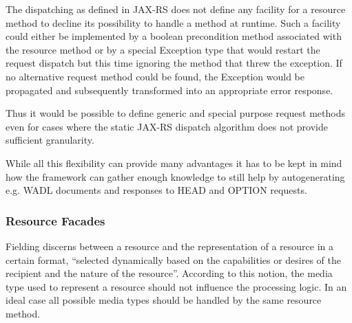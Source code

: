 \documentclass[12pt,a4paper]{scrartcl}		%
\begin{document}
The dispatching as defined in JAX-RS does not define any facility for a resource
method to decline its possibility to handle a method at runtime. Such a facility
could either be implemented by a boolean precondition method associated with the
resource method or by a special Exception type that would restart the request
dispatch but this time ignoring the method that threw the exception. If no
alternative request method could be found, the Exception would be propagated and
subsequently transformed into an appropriate error response.

Thus it would be possible to define generic and special purpose request methods
even for cases where the static JAX-RS dispatch algorithm does not provide
sufficient granularity.

While all this flexibility can provide many advantages it has to be kept in mind
how the framework can gather enough knowledge to still help by autogenerating
e.g. WADL documents and responses to HEAD and OPTION requests.

\subsubsection{Resource Facades}
\label{sec:resourcefacades}
Fielding discerns between a resource and the representation of a resource in a
certain format, ``selected dynamically based on the capabilities or desires of
the recipient and the nature of the resource''\cite[p. 87]{Fielding2000}.
According to this notion, the media type used to represent a resource should not
influence the processing logic. In an ideal case all possible media types should
be handled by the same resource method.

\end{document}
